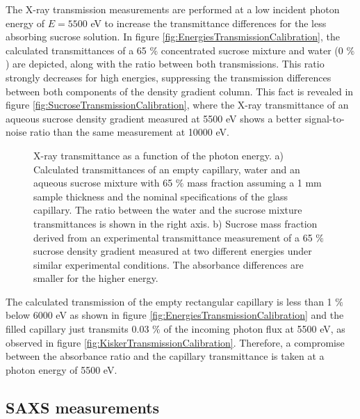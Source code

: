 The X-ray transmission measurements are performed at a low incident photon energy of $E = 5500$ eV to increase the transmittance differences for the less absorbing sucrose solution. In figure \ref{fig:EnergiesTransmissionCalibration}, the calculated transmittances of a 65 $\%$ concentrated sucrose mixture and water (0 $\%$) are depicted, along with the ratio between both transmissions. This ratio strongly decreases for high energies, suppressing the transmission differences between both components of the density gradient column. This fact is revealed in figure \ref{fig:SucroseTransmissionCalibration}, where the X-ray transmittance of an aqueous sucrose density gradient measured at 5500 eV shows a better signal-to-noise ratio than the same measurement at 10000 eV.

\begin{figure*}%
	\centering
	\caption[X-ray transmittance of the density gradient capillary at different energies.]{X-ray transmittance as a function of the photon energy. a) Calculated transmittances \citep{henke_x-ray_1993} of an empty capillary, water and an aqueous sucrose mixture with 65 $\%$ mass fraction assuming a 1 mm sample thickness and the nominal specifications of the glass capillary. The ratio between the water and the sucrose mixture transmittances is shown in the right axis. b) Sucrose mass fraction derived from an experimental transmittance measurement of a 65 $\%$ sucrose density gradient measured at two different energies under similar experimental conditions. The absorbance differences are smaller for the higher energy.}

\end{figure*}

The calculated transmission of the empty rectangular capillary is less than 1 $\%$ below 6000 eV as shown in figure \ref{fig:EnergiesTransmissionCalibration} and the filled capillary just transmits 0.03 $\%$ of the incoming photon flux at 5500 eV, as observed in figure \ref{fig:KiskerTransmissionCalibration}. Therefore, a compromise between the absorbance ratio and the capillary transmittance is taken at a photon energy of 5500 eV. 

\subsection{SAXS measurements}
\label{sec:DensityGradientSAXS}

